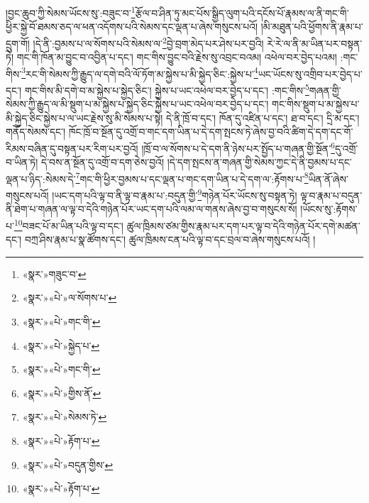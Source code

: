 །བྱང་ཆུབ་ཀྱི་སེམས་ཡོངས་སུ་:བཟུང་བ་\footnote{«སྣར་»གཟུང་བ་}རྩོལ་བ་ཤིན་ཏུ་མང་པོས་སྒྱིད་ལུག་པའི་དངོས་པོ་རྣམས་ལ་ནི་གང་གི་ཕྱིར་སྐྱེ་བོ་ཐམས་ཅད་ལ་ཕན་འདོགས་པའི་སེམས་དང་ལྡན་པ་ཞེས་གསུངས་པའོ། །མི་མཐུན་པའི་ཕྱོགས་ནི་རྣམ་པ་དྲུག་གོ། །དེ་ནི་:བྱམས་པ་ལ་སོགས་པའི་སེམས་ལ་\footnote{«སྣར་»«པེ་»ལ་སོགས་པ་}བྱེ་བྲག་མེད་པར་ཤེས་པར་བྱའི། རེ་རེ་ལ་ནི་མ་ཡིན་པར་བསྟན་ཏེ། གང་གི་ཁོན་མ་བྱུང་བ་འབྱིན་པ་དང་། གང་གིས་བྱུང་བའི་རྗེས་སུ་འབྲང་བའམ། འཕེལ་བར་བྱེད་པའམ། :གང་གིས་\footnote{«སྣར་»«པེ་»གང་གི་}རང་གི་སེམས་ཀྱི་རྒྱུད་ལ་དགེ་བའི་ལོ་ཏོག་མ་སྐྱེས་པ་མི་སྐྱེད་ཅིང་:སྐྱེས་པ་\footnote{«སྣར་»«པེ་»སྐྱེད་པ་}ཡང་ཡོངས་སུ་འགྲིབ་པར་བྱེད་པ་དང་། གང་གིས་མི་དགེ་བ་མ་སྐྱེས་པ་སྐྱེད་ཅིང་། སྐྱེས་པ་ཡང་འཕེལ་བར་བྱེད་པ་དང་། :གང་གིས་\footnote{«སྣར་»«པེ་»གང་གི་}གཞན་གྱི་སེམས་ཀྱི་རྒྱུད་ལ་མི་སྡུག་པ་མ་སྐྱེས་པ་སྐྱེད་ཅིང་སྐྱེས་པ་ཡང་འཕེལ་བར་བྱེད་པ་དང་། གང་གིས་སྡུག་པ་མ་སྐྱེས་པ་མི་སྐྱེད་ཅིང་སྐྱེས་པ་ལ་ཡང་རྗེས་སུ་མི་སེམས་པ་སྟེ། དེ་ནི་ཁྲོ་བ་དང་། ཁོན་དུ་འཛིན་པ་དང་། ཐ་བ་དང་། དྲི་མ་དང་། གནོད་སེམས་དང་། ཁོང་ཁྲོ་བ་སྔོན་དུ་འགྲོ་བ་གང་དག་ཡིན་པ་དེ་དག་སྤངས་ཏེ་ཞེས་བྱ་བའི་ཚིག་དེ་དག་དང་གོ་རིམས་བཞིན་དུ་བསྟན་པར་རིག་པར་བྱའོ། །ཁྲོ་བ་ལ་སོགས་པ་དེ་དག་ནི་ཉེས་པར་སྤྱོད་པ་གཞན་གྱི་སྔོན་\footnote{«སྣར་»«པེ་»གྱིས་ོན་}དུ་འགྲོ་བ་ཡིན་ཏེ། དེ་བས་ན་སྔོན་དུ་འགྲོ་བ་དག་ཅེས་བྱའོ། །དེ་དག་སྤངས་ན་གཞན་གྱི་སེམས་ཀྱང་དེ་ནི་བྱམས་པ་དང་ལྡན་པ་ཉིད་:སེམས་དེ་\footnote{«སྣར་»«པེ་»སེམས་ཏེ་}གང་གི་ཕྱིར་བྱམས་པ་དང་ལྡན་པ་གང་དག་ཡིན་པ་དེ་དག་ལ་:རྟོགས་པ་\footnote{«སྣར་»«པེ་»རྟོག་པ་}ཡིན་ནོ་ཞེས་གསུངས་པའོ། །ཡང་དག་པའི་ལྟ་བ་ནི་ལྟ་བ་རྣམ་པ་:བདུན་གྱི་\footnote{«སྣར་»«པེ་»བདུན་གྱིས་}གཉེན་པོར་ཡོངས་སུ་བསྟན་ཏེ། ལྟ་བ་རྣམ་པ་བདུན་ནི་ཐེག་པ་གཞན་ལ་ལྟ་བ་དེའི་གཉེན་པོར་ཡང་དག་པའི་ལམ་ལ་གནས་ཞེས་བྱ་བ་གསུངས་སོ། །ཡོངས་སུ་:རྟོགས་པ་\footnote{«སྣར་»«པེ་»རྟོག་པ་}བཟང་པོ་མ་ཡིན་པའི་ལྟ་བ་དང་། ཚུལ་ཁྲིམས་ཙམ་གྱིས་རྣམ་པར་དག་པར་ལྟ་བ་དེའི་གཉེན་པོར་དགེ་མཚན་དང་། བཀྲ་ཤིས་རྣམ་པ་སྣ་ཚོགས་དང་། ཚུལ་ཁྲིམས་ངན་པའི་ལྟ་བ་དང་བྲལ་བ་ཞེས་གསུངས་པའོ། །
